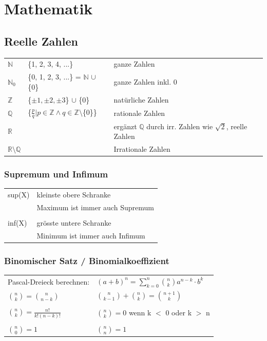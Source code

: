 \section{Mathematik}

    \subsection{Reelle Zahlen}
	
            \begin{tabular}{l l l}
                $\mathbb{N}$  & \{1, 2, 3, 4, ...\} & ganze Zahlen \\
                $\mathbb{N}_0$ & \{0, 1, 2, 3, ...\} = $\mathbb{N}$ $\cup$ \{0\} & ganze Zahlen inkl. 0 \\
                $\mathbb{Z}$ & \{$\pm1, \pm2, \pm3 $\} $\cup$ \{0\} & natürliche Zahlen \\
                $\mathbb{Q}$ & \{$ \frac{p}{q} | p \in \mathbb{Z} \wedge q \in \mathbb{Z} \setminus $\{0\}\} & rationale Zahlen \\
                $\mathbb{R}$ & & ergänzt $\mathbb{Q}$ durch irr. Zahlen wie $\sqrt{2}$, reelle Zahlen \\
                $\mathbb{R} \setminus \mathbb{Q}$ & & Irrationale Zahlen \\
            \end{tabular}


			\subsubsection{Supremum und Infimum}
				\begin{tabular}{ll} 
				sup(X) & kleinste obere Schranke  \\
				 & Maximum ist immer auch Supremum \\
				\\
                 inf(X) &  grösste untere Schranke \\ 
				 & Minimum ist immer auch Infimum
				\end{tabular}
				
				 
			 \subsubsection{Binomischer Satz / Binomialkoeffizient}	
				 \begin{tabular}{ll} 
				  Pascal-Dreieck berechnen:  & $\left(a+b\right)^n = \sum\limits _{k=0}^n \binom{n}{k}a^{n-k}\cdot b^k$ \\
				 $\binom{n}{k}=\binom{n}{n-k}$ & $\binom{n}{k-1}+\binom{n}{k}=\binom{n+1}{k}$ \\
				 \\
				  $\binom{n}{k}=\frac{n!}{k!\left(n-k\right)!}$ & $\binom{n}{k} = 0$ wenn k $<$ 0 oder k $>$ n \\ 
				  \\
				 $\binom{n}{0}=1$ &  $\binom{n}{n}=1$ \\ 	 		
				\end{tabular}
				 
